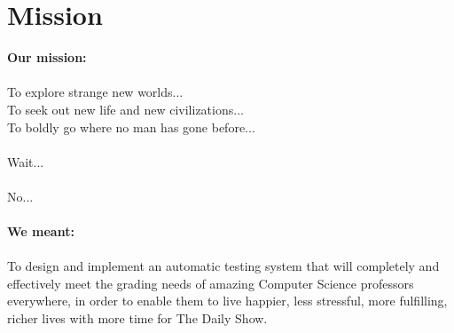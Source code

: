 
\chapter{Mission}

\textbf{Our mission:}
\\
\\To explore strange new worlds...
\\To seek out new life and new civilizations...
\\To boldly go where no man has gone before...
\\
\\Wait...
\\
\\No...
\\
\\ \textbf{We meant:}
\\
\\To design and implement an automatic testing system that will completely and effectively meet the grading needs of amazing Computer Science professors everywhere, in order to enable them to live happier, less stressful, more fulfilling, richer lives with more time for The Daily Show.